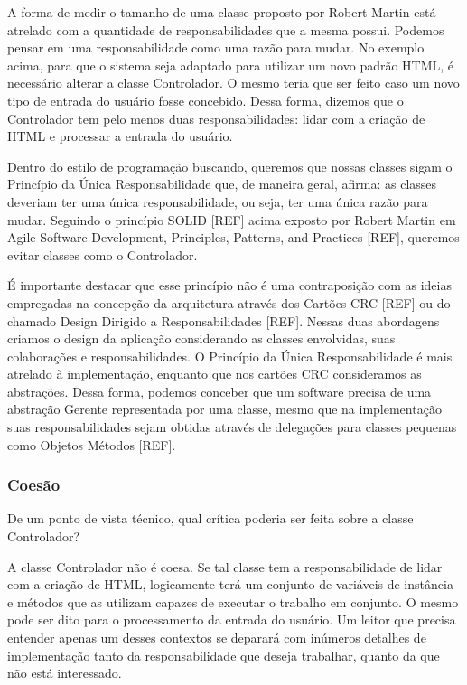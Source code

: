 A forma de medir o tamanho de uma classe proposto por Robert Martin está atrelado com a quantidade de responsabilidades que a mesma possui. Podemos pensar em uma responsabilidade como uma razão para mudar. No exemplo acima, para que o sistema seja adaptado para utilizar um novo padrão HTML, é necessário alterar a classe Controlador. O mesmo teria que ser feito caso um novo tipo de entrada do usuário fosse concebido. Dessa forma, dizemos que o Controlador tem pelo menos duas responsabilidades: lidar com a criação de HTML e processar a entrada do usuário.
	
Dentro do estilo de programação buscando, queremos que nossas classes sigam o Princípio da Única Responsabilidade que, de maneira geral, afirma: as classes deveriam ter uma única responsabilidade, ou seja, ter uma única razão para mudar. Seguindo o princípio SOLID [REF] acima exposto por Robert Martin em Agile Software Development, Principles, Patterns, and Practices [REF], queremos evitar classes como o Controlador.

É importante destacar que esse princípio não é uma contraposição com as ideias empregadas na concepção da arquitetura através dos Cartões CRC [REF] ou do chamado Design Dirigido a Responsabilidades [REF]. Nessas duas abordagens criamos o design da aplicação considerando as classes envolvidas, suas colaborações e responsabilidades. O Princípio da Única Responsabilidade é mais atrelado à implementação, enquanto que nos cartões CRC consideramos as abstrações. Dessa forma, podemos conceber que um software precisa de uma abstração Gerente representada por uma classe, mesmo que na implementação suas responsabilidades sejam obtidas através de delegações para classes pequenas como Objetos Métodos [REF].

\subsubsection{Coesão}
De um ponto de vista técnico, qual crítica poderia ser feita sobre a classe Controlador? 
	
A classe Controlador não é coesa. Se tal classe tem a responsabilidade de lidar com a criação de HTML, logicamente terá um conjunto de variáveis de instância e métodos que as utilizam capazes de executar o trabalho em conjunto. O mesmo pode ser dito para o processamento da entrada do usuário. Um leitor que precisa entender apenas um desses contextos se deparará com inúmeros detalhes de implementação tanto da responsabilidade que deseja trabalhar, quanto da que não está interessado.
	
